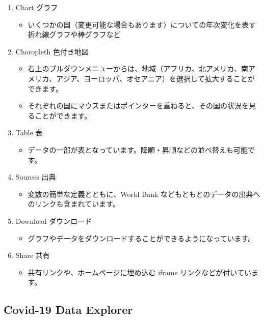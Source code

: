 \documentclass[
  xelatex, ja=standard]{bxjsbook}
\providecommand{\tightlist}{%
  \setlength{\itemsep}{0pt}\setlength{\parskip}{0pt}}
\theoremstyle{definition}
\theoremstyle{definition}
\theoremstyle{definition}
\theoremstyle{definition}
\theoremstyle{remark}
\begin{document}
\begin{enumerate}
\def\labelenumi{\arabic{enumi}.}
\item
  Chart グラフ

  \begin{itemize}
  \tightlist
  \item
    いくつかの国（変更可能な場合もあります）についての年次変化を表す折れ線グラフや棒グラフなど
  \end{itemize}
\item
  Choropleth 色付き地図

  \begin{itemize}
  \item
    右上のプルダウンメニューからは、地域（アフリカ、北アメリカ、南アメリカ、アジア、ヨーロッパ、オセアニア）を選択して拡大することができます。
  \item
    それぞれの国にマウスまたはポインターを重ねると、その国の状況を見ることができます。
  \end{itemize}
\item
  Table 表

  \begin{itemize}
  \tightlist
  \item
    データの一部が表となっています。降順・昇順などの並べ替えも可能です。
  \end{itemize}
\item
  Sources 出典

  \begin{itemize}
  \tightlist
  \item
    変数の簡単な定義とともに、World Bank などもともとのデータの出典へのリンクも含まれています。
  \end{itemize}
\item
  Download ダウンロード

  \begin{itemize}
  \tightlist
  \item
    グラフやデータをダウンロードすることができるようになっています。
  \end{itemize}
\item
  Share 共有

  \begin{itemize}
  \tightlist
  \item
    共有リンクや、ホームページに埋め込む iframe リンクなどが付いています。
  \end{itemize}
\end{enumerate}

\hypertarget{covid-19-data-explorer}{%
\subsection{Covid-19 Data Explorer}\label{covid-19-data-explorer}}
\end{document}
